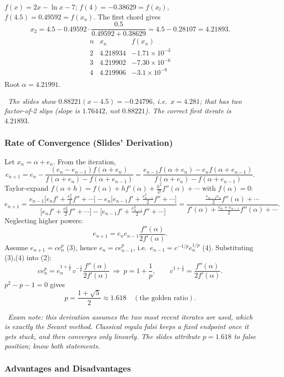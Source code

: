 \documentclass[hidelinks]{article}
\newcommand{\callout}[1]{\par\smallskip\noindent{\color{capri}$\blacktriangleright$}\ \textit{#1}\par\smallskip}
\begin{document}
$f(x)=2x-\ln x-7$; $f(4)=-0.38629=f(x_l)$, $f(4.5)=0.49592=f(x_u)$. The first chord gives
\[
x_2=4.5-0.49592\cdot\frac{0.5}{0.49592+0.38629}=4.5-0.28107=4.21893 .
\]
\[
\begin{array}{ccc}
n & x_n & f(x_n)\\ \hline
2 & 4.218934 & -1.71\times10^{-3}\\
3 & 4.219902 & -7.30\times10^{-6}\\
4 & 4.219906 & -3.1\times10^{-8}\\
\end{array}
\]
Root $\alpha=4.21991$.
\callout{The slides show $0.88221(x-4.5)=-0.24796$, i.e.\ $x=4.281$; that has two factor-of-2 slips (slope is $1.76442$, not $0.88221$). The correct first iterate is $4.21893$.}

\subsubsection{Rate of Convergence (Slides' Derivation)}

Let $x_n=\alpha+e_n$. From the iteration,
\[
e_{n+1}=e_n-\frac{(e_n-e_{n-1})f(\alpha+e_n)}{f(\alpha+e_n)-f(\alpha+e_{n-1})}
=\frac{e_{n-1}f(\alpha+e_n)-e_nf(\alpha+e_{n-1})}{f(\alpha+e_n)-f(\alpha+e_{n-1})}.
\]
Taylor-expand $f(\alpha+h)=f(\alpha)+hf'(\alpha)+\frac{h^2}{2!}f''(\alpha)+\cdots$ with $f(\alpha)=0$:
\[
e_{n+1}=\frac{e_{n-1}\big[e_nf'+\frac{e_n^2}2f''+\cdots\big]-e_n\big[e_{n-1}f'+\frac{e_{n-1}^2}2f''+\cdots\big]}{\big[e_nf'+\frac{e_n^2}2f''+\cdots\big]-\big[e_{n-1}f'+\frac{e_{n-1}^2}2f''+\cdots\big]}
=\frac{\frac{e_{n-1}e_n}{2}f''(\alpha)+\cdots}{f'(\alpha)+\frac{e_n+e_{n-1}}2f''(\alpha)+\cdots}.
\]
Neglecting higher powers:
\[
e_{n+1}=e_ne_{n-1}\frac{f''(\alpha)}{2f'(\alpha)}.\tag{2}
\]
Assume $e_{n+1}=ce_n^p$ (3), hence $e_n=ce_{n-1}^p$, i.e.\ $e_{n-1}=c^{-1/p}e_n^{1/p}$ (4). Substituting (3),(4) into (2):
\[
ce_n^p=e_n^{1+\frac1p}\,c^{-\frac1p}\frac{f''(\alpha)}{2f'(\alpha)}
\ \Longrightarrow\
p=1+\frac1p,\qquad c^{1+\frac1p}=\frac{f''(\alpha)}{2f'(\alpha)} .
\]
$p^2-p-1=0$ gives
\[
p=\frac{1+\sqrt5}{2}\approx1.618\quad(\text{the golden ratio}).
\]
\callout{Exam note: this derivation assumes the two \emph{most recent} iterates are used, which is exactly the Secant method. Classical regula falsi keeps a fixed endpoint once it gets stuck, and then converges only \emph{linearly}. The slides attribute $p=1.618$ to false position; know both statements.}

\subsubsection{Advantages and Disadvantages}
\end{document}
